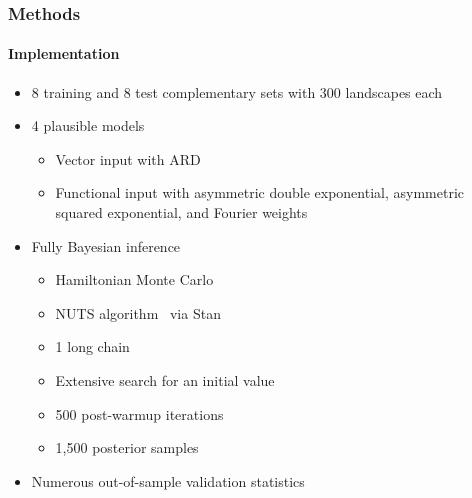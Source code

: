 \documentclass{snedecorbeamer}
\begin{document}
\begin{frame}
  \frametitle{Methods}
  \framesubtitle{Implementation}

  \begin{itemize}
  \item 8 training and 8 test complementary sets with 300 landscapes each
  \item 4 plausible models
    \begin{itemize}
    \item Vector input with ARD
    \item Functional input with asymmetric double exponential, asymmetric
      squared exponential, and Fourier weights
    \end{itemize}
  \item
    \hyperlink{frm:inference}{}
    Fully Bayesian inference
    \begin{itemize}
    \item Hamiltonian Monte Carlo~\cite[ch. 5]{brooks2011}
    \item NUTS algorithm~\cite{hoffman2014} via
      Stan~\cite{standevelopmentteam2021}
    \item 1 long chain~\cite{raftery1992}
    \item Extensive search for an initial value
    \item 500 post-warmup iterations
    \item 1,500 posterior samples
    \end{itemize}
  \item \hyperlink{frm:validation}{}
    Numerous out-of-sample validation statistics
  \end{itemize}
\end{frame}
\end{document}
